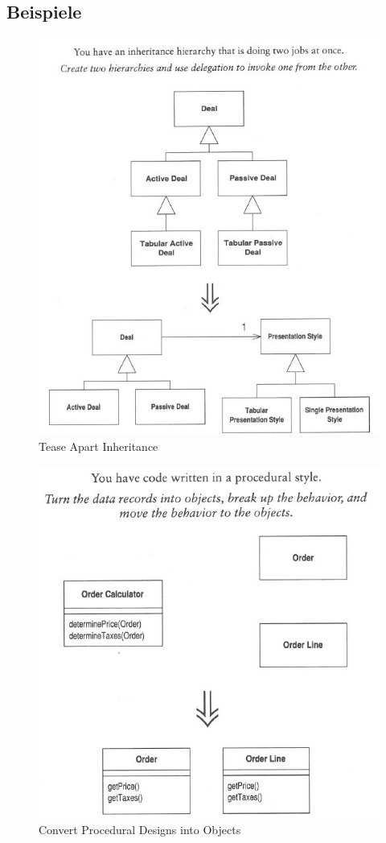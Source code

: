 \subsection{Beispiele}

\begin{figure}[h!]
	\centering
	\includegraphics[width=0.7\linewidth]{fig/tease-apart-inheritance}
	\caption{Tease Apart Inheritance}
	\label{fig:tease-apart-inheritance}
\end{figure}

\begin{figure}[h!]
	\centering
	\includegraphics[width=0.7\linewidth]{fig/proc-to-object}
	\caption{Convert Procedural Designs into Objects}
	\label{fig:proc-to-object}
\end{figure}

